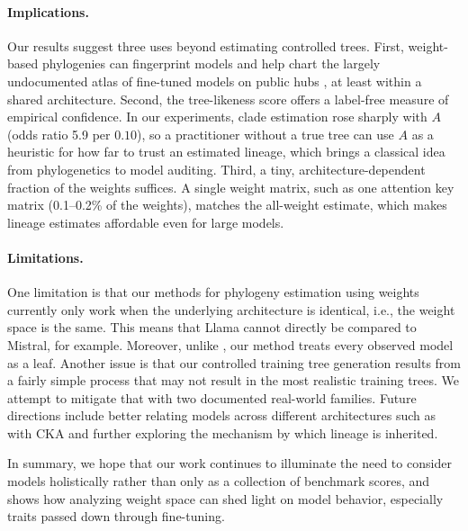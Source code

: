 \documentclass{article}
\theoremstyle{definition}
\theoremstyle{plain}
\begin{document}
\paragraph{Implications.} Our results suggest three uses beyond estimating controlled trees. First, weight-based phylogenies can fingerprint models and help chart the largely undocumented atlas of fine-tuned models on public hubs \citep{horwitz2025chartatlasworldsmodels}, at least within a shared architecture. Second, the tree-likeness score offers a label-free measure of empirical confidence. In our experiments, clade estimation rose sharply with $A$ (odds ratio 5.9 per $0.10$), so a practitioner without a true tree can use $A$ as a heuristic for how far to trust an estimated lineage, which brings a classical idea from phylogenetics to model auditing. Third, a tiny, architecture-dependent fraction of the weights suffices. A single weight matrix, such as one attention key matrix (0.1--0.2\% of the weights), matches the all-weight estimate, which makes lineage estimates affordable even for large models.

\paragraph{Limitations.} One limitation is that our methods for phylogeny estimation using weights currently only work when the underlying architecture is identical, i.e., the weight space is the same.  This means that Llama cannot directly be compared to Mistral, for example. Moreover, unlike \citet{horwitz2025mother}, our method treats every observed model as a leaf. Another issue is that our controlled training tree generation results from a fairly simple process that may not result in the most realistic training trees.  We attempt to mitigate that with two documented real-world families. Future directions include better relating models across different architectures such as with CKA and further exploring the mechanism by which lineage is inherited. 

In summary, we hope that our work continues to illuminate the need to consider models holistically rather than only as a collection of benchmark scores, and shows how analyzing weight space can shed light on model behavior, especially traits passed down through fine-tuning.


\end{document}
